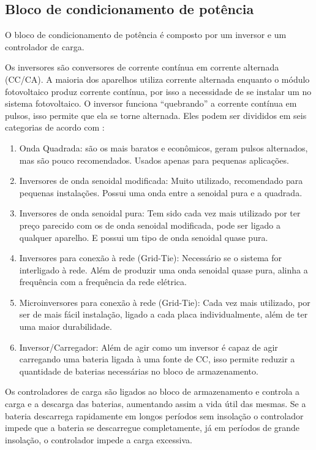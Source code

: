 \subsection{Bloco de condicionamento de potência}

O bloco de condicionamento de potência é composto por um inversor e um controlador de carga.

Os inversores são conversores de corrente contínua em corrente alternada (CC/CA). A maioria dos aparelhos utiliza corrente alternada enquanto o módulo fotovoltaico produz corrente contínua, por isso a necessidade de se instalar um no sistema fotovoltaico. O inversor funciona “quebrando” a corrente contínua em pulsos, isso permite que ela se torne alternada. Eles podem ser divididos em seis categorias de acordo com \cite{neosolaronda}:

\begin{enumerate}
    \item Onda Quadrada: são os mais baratos e econômicos, geram pulsos alternados, mas são pouco recomendados. Usados apenas para pequenas aplicações.
	\item Inversores de onda senoidal modificada: Muito utilizado, recomendado para pequenas instalações. Possui uma onda entre a senoidal pura e a quadrada.
	\item Inversores de onda senoidal pura: Tem sido cada vez mais utilizado por ter preço parecido com os de onda senoidal modificada, pode ser ligado a qualquer aparelho. E possui um tipo de onda senoidal quase pura. 
	\item Inversores para conexão à rede (Grid-Tie): Necessário se o sistema for interligado à rede. Além de produzir uma onda senoidal quase pura, alinha a frequência com a frequência da rede elétrica.
	\item Microinversores para conexão à rede (Grid-Tie): Cada vez mais utilizado, por ser de mais fácil instalação, ligado a cada placa individualmente, além de ter uma maior durabilidade.
	\item Inversor/Carregador: Além de agir como um inversor é capaz de agir carregando uma bateria ligada à uma fonte de CC, isso permite reduzir a quantidade de baterias necessárias no bloco de armazenamento.
\end{enumerate}

Os controladores de carga são ligados ao bloco de armazenamento e controla a carga e a descarga das baterias, aumentando assim a vida útil das mesmas. Se a bateria descarrega rapidamente em longos períodos sem insolação o controlador impede que a bateria se descarregue completamente, já em períodos de grande insolação, o controlador impede a carga excessiva.

